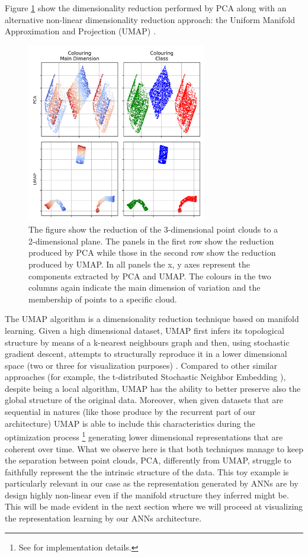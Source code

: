 Figure \ref{fig: swiss_reduce} show the dimensionality reduction performed by PCA along with an alternative non-linear dimensionality reduction approach: the Uniform Manifold Approximation and Projection (UMAP) \cite{2018arXivUMAP}. 
\label{dim_reduction}
\begin{figure}[h]
  \centering
  \includegraphics[width=0.7\textwidth]{images/chapter_4/reduced.png}
    \caption[\textbf{PCA and UMAP reduction of Swiss roll and square}]{The figure show the reduction of the 3-dimensional point clouds to a 2-dimensional plane. The panels in the first row show the reduction produced by PCA while those in the second row show the reduction produced by UMAP. In all panels the x, y axes represent the components extracted by PCA and UMAP. The colours in the two columns again indicate the main dimension of variation and the membership of points to a specific cloud.}
    \label{fig: swiss_reduce}
\end{figure}
The UMAP algorithm is a dimensionality reduction technique based on manifold learning. Given a high dimensional dataset, UMAP first infers its topological structure by means of a k-nearest neighbours graph and then, using stochastic gradient descent, attempts to structurally reproduce it in a lower dimensional space (two or three for visualization purposes) \cite{2018arXivUMAP}. Compared to other similar approaches (for example, the t-distributed Stochastic Neighbor Embedding \cite{van2008visualizing}), despite being a local algorithm, UMAP has the ability to better preserve also the global structure of the original data. Moreover, when given datasets that are sequential in natures (like those produce by the recurrent part of our architecture) UMAP is able to include this characteristics during the optimization process \footnote{See \cite{alignedumap} for implementation details.} generating lower dimensional representations that are coherent over time. What we observe here is that both techniques manage to keep the separation between point clouds, PCA, differently from UMAP, struggle to faithfully represent the the intrinsic structure of the data. This toy example is particularly relevant in our case as the representation generated by ANNs are by design highly non-linear even if the manifold structure they inferred might be. This will be made evident in the next section where we will proceed at visualizing the representation learning by our ANNs architecture.

